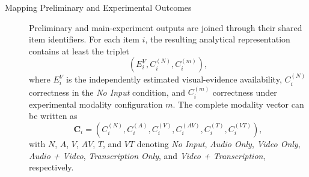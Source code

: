 \begin{description}
\item[Mapping Preliminary and Experimental Outcomes] 
Preliminary and main-experiment outputs are joined through their shared item identifiers. For each item \(i\), the resulting analytical representation contains at least the triplet
\begin{equation}
\left(
E_i^{V},
C_i^{(N)},
C_i^{(m)}
\right),
\end{equation}
where \(E_i^{V}\) is the independently estimated visual-evidence availability, \(C_i^{(N)}\) correctness in the \textit{No Input} condition, and \(C_i^{(m)}\) correctness under experimental modality configuration \(m\). The complete modality vector can be written as
\begin{equation}
\mathbf{C}_i
=
\left(
C_i^{(N)},
C_i^{(A)},
C_i^{(V)},
C_i^{(AV)},
C_i^{(T)},
C_i^{(VT)}
\right),
\end{equation}
with \(N\), \(A\), \(V\), \(AV\), \(T\), and \(VT\) denoting \textit{No Input}, \textit{Audio Only}, \textit{Video Only}, \textit{Audio + Video}, \textit{Transcription Only}, and \textit{Video + Transcription}, respectively.


\end{description}
